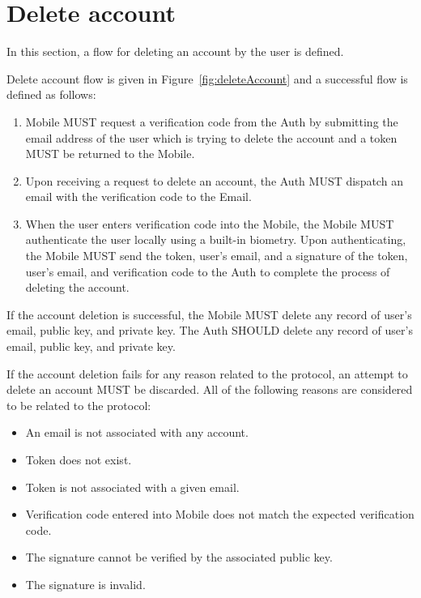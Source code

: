 \section{Delete account}
In this section, a flow for deleting an account by the user is defined. 
\medskip

Delete account flow is given in Figure~\ref{fig:deleteAccount} and a successful flow is defined as follows:
    \begin{enumerate}
        \item Mobile MUST request a verification code from the Auth by submitting the email address of the user
              which is trying to delete the account and a token MUST be returned to the Mobile.
        \item Upon receiving a request to delete an account, the Auth MUST dispatch an email with the verification
              code to the Email.
        \item When the user enters verification code into the Mobile, the Mobile MUST authenticate the user locally 
              using a built-in biometry. Upon authenticating, the Mobile MUST send the token, user's email, and a 
              signature of the token, user's email, and verification code to the Auth to complete the process of 
              deleting the account.
    \end{enumerate}
    
If the account deletion is successful, the Mobile MUST delete any record of user's email, public key, and 
private key. The Auth SHOULD delete any record of user's email, public key, and private key.
\medskip

If the account deletion fails for any reason related to the protocol, an attempt to delete an account MUST be 
discarded. All of the following reasons are considered to be related to the protocol:
    \begin{itemize}
        \item An email is not associated with any account.
        \item Token does not exist.
        \item Token is not associated with a given email.
        \item Verification code entered into Mobile does not match the expected verification code.
        \item The signature cannot be verified by the associated public key.
        \item The signature is invalid.
    \end{itemize}

